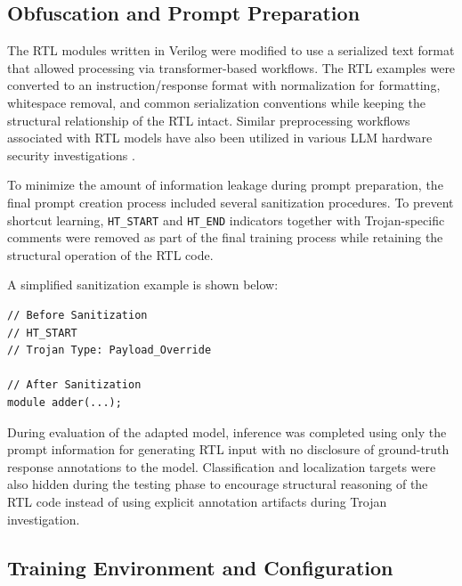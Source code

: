 \documentclass[conference]{IEEEtran}
\begin{document}
\subsection{Obfuscation and Prompt Preparation}
\label{subsec:obfuscation_prompt}

The RTL modules written in Verilog were modified to use a serialized text format that allowed processing via transformer-based workflows. The RTL examples were converted to an instruction/response format with normalization for formatting, whitespace removal, and common serialization conventions while keeping the structural relationship of the RTL intact. Similar preprocessing workflows associated with RTL models have also been utilized in various LLM hardware security investigations \cite{kundu2025pearl,trojanwhisper}.

To minimize the amount of information leakage during prompt preparation, the final prompt creation process included several sanitization procedures. To prevent shortcut learning, \texttt{HT\_START} and \texttt{HT\_END} indicators together with Trojan-specific comments were removed as part of the final training process while retaining the structural operation of the RTL code.

A simplified sanitization example is shown below:

\begin{verbatim}
// Before Sanitization
// HT_START
// Trojan Type: Payload_Override

// After Sanitization
module adder(...);
\end{verbatim}

During evaluation of the adapted model, inference was completed using only the prompt information for generating RTL input with no disclosure of ground-truth response annotations to the model. Classification and localization targets were also hidden during the testing phase to encourage structural reasoning of the RTL code instead of using explicit annotation artifacts during Trojan investigation.

\subsection{Training Environment and Configuration}
\label{subsec:training_environment}
\end{document}
